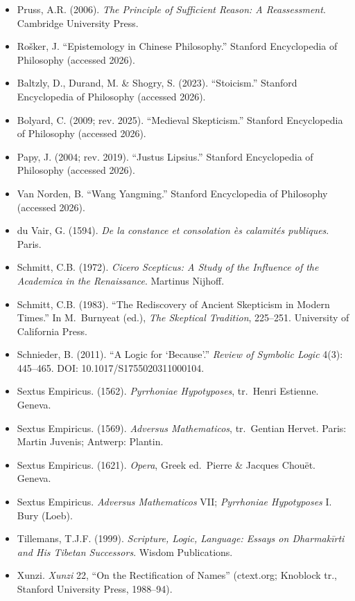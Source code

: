 \documentclass[11pt]{article}
\theoremstyle{plain}
\theoremstyle{definition}
\theoremstyle{remark}
\begin{document}
\begin{itemize}
{on Buddhist Metaphysics and the Catu\c{s}ko\d{t}i}. Oxford University Press.
\item Pruss, A.R. (2006). \emph{The Principle of Sufficient Reason: A
Reassessment}. Cambridge University Press.
\item Ro\v{s}ker, J. ``Epistemology in Chinese Philosophy.'' Stanford
Encyclopedia of Philosophy (accessed 2026).
\item Baltzly, D., Durand, M. \& Shogry, S. (2023). ``Stoicism.''
Stanford Encyclopedia of Philosophy (accessed 2026).
\item Bolyard, C. (2009; rev. 2025). ``Medieval Skepticism.'' Stanford
Encyclopedia of Philosophy (accessed 2026).
\item Papy, J. (2004; rev. 2019). ``Justus Lipsius.'' Stanford
Encyclopedia of Philosophy (accessed 2026).
\item Van Norden, B. ``Wang Yangming.'' Stanford Encyclopedia of
Philosophy (accessed 2026).
\item du Vair, G. (1594). \emph{De la constance et consolation \`es
calamit\'es publiques}. Paris.
\item Schmitt, C.B. (1972). \emph{Cicero Scepticus: A Study of the
Influence of the Academica in the Renaissance}. Martinus Nijhoff.
\item Schmitt, C.B. (1983). ``The Rediscovery of Ancient Skepticism in
Modern Times.'' In M.~Burnyeat (ed.), \emph{The Skeptical Tradition},
225--251. University of California Press.
\item Schnieder, B. (2011). ``A Logic for `Because'.'' \emph{Review of
Symbolic Logic} 4(3): 445--465. DOI:
10.1017/S1755020311000104.
\item Sextus Empiricus. (1562). \emph{Pyrrhoniae Hypotyposes}, tr.\
Henri Estienne. Geneva.
\item Sextus Empiricus. (1569). \emph{Adversus Mathematicos}, tr.\
Gentian Hervet. Paris: Martin Juvenis; Antwerp: Plantin.
\item Sextus Empiricus. (1621). \emph{Opera}, Greek ed.\ Pierre \&
Jacques Chou\"et. Geneva.
\item Sextus Empiricus. \emph{Adversus Mathematicos} VII;
\emph{Pyrrhoniae Hypotyposes} I. Bury (Loeb).
\item Tillemans, T.J.F. (1999). \emph{Scripture, Logic, Language:
Essays on Dharmak\={i}rti and His Tibetan Successors}. Wisdom
Publications.
\item Xunzi. \emph{Xunzi} 22, ``On the Rectification of Names''
(ctext.org; Knoblock tr., Stanford University Press, 1988--94).
\end{itemize}
\end{document}
